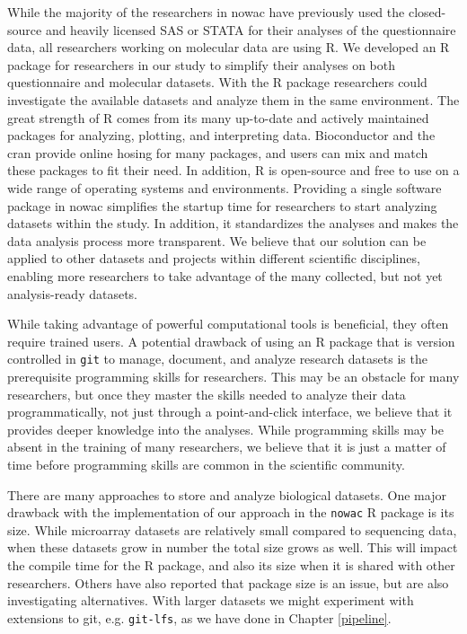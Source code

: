 While the majority of the researchers in \gls{nowac} have previously used the
closed-source and heavily licensed SAS or STATA for their analyses of the
questionnaire data, all researchers working on molecular data are using R.
We developed an R package for researchers in our study to simplify
their analyses on both questionnaire and molecular datasets.  With
the R package researchers could investigate the available datasets and analyze
them in the same environment. The great strength of R comes from its many
up-to-date and actively maintained packages for analyzing, plotting, and
interpreting data. Bioconductor\cite{bioconductor} and the \gls{cran}\cite{cran}
provide online hosing for many packages, and users can mix and match these
packages to fit their need. In addition, R is open-source and free to use on a
wide range of operating systems and environments. Providing a single software
package in \gls{nowac} simplifies the startup time for researchers to start
analyzing datasets within the study.  In addition, it standardizes the analyses
and makes the data analysis process more transparent.  We believe that our
solution can be applied to other datasets and projects within different
scientific disciplines, enabling more researchers to take advantage of the many
collected, but not yet analysis-ready datasets. 

While taking advantage of powerful computational tools is beneficial, they often
require trained users. A potential drawback of using an R package that is
version controlled in \texttt{git} to manage, document, and analyze research
datasets is the prerequisite programming skills for researchers. This may be an
obstacle for many researchers, but once they master the skills needed to analyze
their data programmatically, not just through a point-and-click interface, we
believe that it provides deeper knowledge into the analyses. While programming
skills may be absent in the training of many researchers, we believe that it is
just a matter of time before programming skills are common in the scientific
community. 

There are many approaches to store and analyze biological datasets. One major
drawback with the implementation of our approach in the \texttt{nowac} R package
is its size. While microarray datasets are relatively small compared to
sequencing data, when these datasets grow in number the total size grows as
well. This will impact the compile time for the R package, and also its size
when it is shared with other researchers. Others have also reported that package
size is an issue, but are also investigating
alternatives.\cite{finak2018datapackager} With larger datasets we might
experiment with extensions to git, e.g. \texttt{git-lfs}, as we have done in
Chapter \ref{pipeline}.

